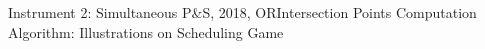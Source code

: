 \documentclass[14pt]{beamer}
\begin{document}
\begin{frame}{Instrument 2: Simultaneous P\&S, {\footnotesize 2018, OR}}{Intersection Points Computation Algorithm: Illustrations on Scheduling Game}
\small
\vspace{-7mm}
\begin{figure}[t]
	\label{figure:IPCExample}
	\vspace{-8mm}
\end{figure}
\end{frame}
\end{document}
